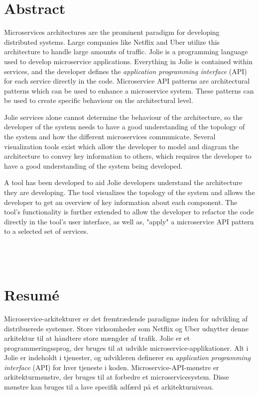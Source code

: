 \section*{\centering Abstract}
Microservices architectures are the prominent paradigm for developing distributed systems.
Large companies like Netflix and Uber utilize this architecture to handle large amounts of traffic.
Jolie is a programming language used to develop microservice applications.
Everything in Jolie is contained within services, and the developer defines the \emph{application programming interface} (API) for each service directly in the code.
Microservice API patterns are architectural patterns which can be used to enhance a microservice system.
These patterns can be used to create specific behaviour on the architectural level.

Jolie services alone cannot determine the behaviour of the architecture, so the developer of the system needs to have a good understanding of the topology of the system and how the different microservices communicate.
Several visualization tools exist which allow the developer to
 model and diagram the architecture to convey key information to others, which requires the developer to have a good understanding of the system being developed.

A tool has been developed to aid Jolie developers understand the architecture they are developing. The tool visualizes the topology of the system and allows the developer to 
get an overview of key information about each component. The tool's functionality is further extended to allow the developer to refactor the code directly in the tool's user interface, as well as, "apply" a microservice API pattern to a selected set of services.
\\
\\
\\
\\
\section*{\centering Resumé}
Microservice-arkitekturer er det fremtrædende paradigme inden for udvikling af distribuerede systemer.
Store virksomheder som Netflix og Uber udnytter denne arkitektur til at håndtere store mængder af trafik.
Jolie er et programmeringssprog, der bruges til at udvikle microservice-applikationer.
Alt i Jolie er indeholdt i tjenester, og udvikleren definerer en \emph{application programming interface} (API) for hver tjeneste i koden.
Microservice-API-mønstre er arkitekturmønstre, der bruges til at forbedre et microservicesystem.
Disse mønstre kan bruges til a lave specifik adfærd på et arkitekturniveau.

